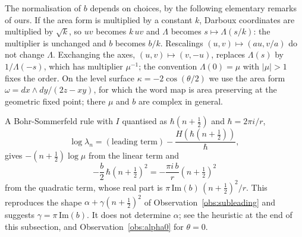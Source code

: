 \documentclass[11pt]{amsart}
\theoremstyle{definition}
\theoremstyle{remark}
\begin{document}
The normalisation of $b$ depends on choices, by the following elementary remarks of
ours. If the area form is multiplied by a constant $k$, Darboux coordinates are
multiplied by $\sqrt k$, so $uv$ becomes $k\,uv$ and $\Lambda$ becomes
$s \mapsto \Lambda(s/k)$: the multiplier is unchanged and $b$ becomes $b/k$. Rescalings
$(u,v) \mapsto (au, v/a)$ do not change $\Lambda$. Exchanging the axes,
$(u,v) \mapsto (v,-u)$, replaces $\Lambda(s)$ by $1/\Lambda(-s)$, which has multiplier
$\mu^{-1}$; the convention $\Lambda(0) = \mu$ with $|\mu| > 1$ fixes the order. On the
level surface $\kappa = -2\cos(\theta/2)$ we use the area form
$\omega = dx\wedge dy/(2z - xy)$, for which the word map is area preserving at the
geometric fixed point; there $\mu$ and $b$ are complex in general.

A Bohr-Sommerfeld rule with $I$ quantised as $\hbar(n+\tfrac12)$ and
$\hbar = 2\pi i/r$,
\[
\log\lambda_n = (\text{leading term}) - \frac{H(\hbar(n+\frac12))}{\hbar},
\]
gives $-(n+\tfrac12)\log\mu$ from the linear term and
\[
-\frac{b}{2}\,\hbar\left(n+\tfrac12\right)^2 = -\frac{\pi i\, b}{r}\left(n+\tfrac12\right)^2
\]
from the quadratic term, whose real part is $\pi\,\mathrm{Im}(b)\,(n+\tfrac12)^2/r$.
This reproduces the shape $\alpha + \gamma(n+\frac12)^2$ of
Observation~\ref{obs:subleading} and suggests $\gamma = \pi\,\mathrm{Im}(b)$. It does
not determine $\alpha$; see the heuristic at the end of this subsection, and
Observation~\ref{obs:alpha0} for $\theta = 0$.
\end{document}
